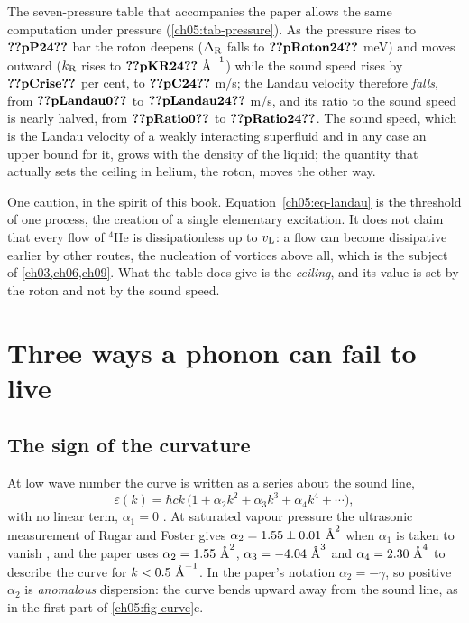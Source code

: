 The seven-pressure table that accompanies the paper allows the same computation under pressure (\cref{ch05:tab-pressure}).
As the pressure rises to $\cfiveV{pP24}$ bar the roton deepens ($\Delta_{\rm R}$ falls to $\cfiveV{pRoton24}$ meV) and moves outward ($k_{\rm R}$ rises to $\cfiveV{pKR24}\ \cfiveAng^{-1}$) while the sound speed rises by $\cfiveV{pCrise}$ per cent, to $\cfiveV{pC24}$ m/s; the Landau velocity therefore \emph{falls}, from $\cfiveV{pLandau0}$ to $\cfiveV{pLandau24}$ m/s, and its ratio to the sound speed is nearly halved, from $\cfiveV{pRatio0}$ to $\cfiveV{pRatio24}$.
The sound speed, which is the Landau velocity of a weakly interacting superfluid and in any case an upper bound for it, grows with the density of the liquid; the quantity that actually sets the ceiling in helium, the roton, moves the other way.


One caution, in the spirit of this book.
Equation~\eqref{ch05:eq-landau} is the threshold of one process, the creation of a single elementary excitation.
It does not claim that every flow of $^4$He is dissipationless up to $v_{\rm L}$: a flow can become dissipative earlier by other routes, the nucleation of vortices above all, which is the subject of \cref{ch03,ch06,ch09}.
What the table does give is the \emph{ceiling}, and its value is set by the roton and not by the sound speed.

\section{Three ways a phonon can fail to live}\label{ch05:sec-decays}

\subsection{The sign of the curvature}
At low wave number the curve is written as a series about the sound line,
\begin{equation}\label{ch05:eq-series}
 \varepsilon(k)=\hbar ck\,\bigl(1+\alpha_2k^2+\alpha_3k^3+\alpha_4k^4+\cdots\bigr),
\end{equation}
with no linear term, $\alpha_1=0$ \cite{Godfrin2021}.
At saturated vapour pressure the ultrasonic measurement of Rugar and Foster gives $\alpha_2=1.55\pm0.01\ \text{\AA}^{2}$ when $\alpha_1$ is taken to vanish \cite{RugarFoster1984}, and the paper uses $\alpha_2=1.55\ \text{\AA}^2$, $\alpha_3=-4.04\ \text{\AA}^3$ and $\alpha_4=2.30\ \text{\AA}^4$ to describe the curve for $k<0.5\ \text{\AA}^{-1}$.
In the paper's notation $\alpha_2=-\gamma$, so positive $\alpha_2$ is \emph{anomalous} dispersion: the curve bends upward away from the sound line, as in the first part of \cref{ch05:fig-curve}c.

